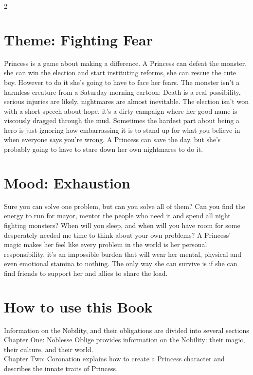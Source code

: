 \begin{multicols}{2}
\section*{Theme: Fighting Fear}

Princess is a game about making a difference. A Princess can defeat the monster, she can win the election and start instituting reforms, she can rescue the cute boy. However to do it she’s going to have to face her fears. The monster isn’t a harmless creature from a Saturday morning cartoon: Death is a real possibility, serious injuries are likely, nightmares are almost inevitable. The election isn’t won with a short speech about hope, it’s a dirty campaign where her good name is viscously dragged through the mud. Sometimes the hardest part about being a hero is just ignoring how embarrassing it is to stand up for what you believe in when everyone says you're wrong. A Princess can save the day, but she’s probably going to have to stare down her own nightmares to do it. 

\section*{Mood: Exhaustion}

Sure you can solve one problem, but can you solve all of them? Can you find the energy to run for mayor, mentor the people who need it and spend all night fighting monsters? When will you sleep, and when will you have room for some desperately needed me time to think about your own problems? A Princess’ magic makes her feel like every problem in the world is her personal responsibility, it’s an impossible burden that will wear her mental, physical and even emotional stamina to nothing. The only way she can survive is if she can find friends to support her and allies to share the load. 

\section*{How to use this Book}

Information on the Nobility, and their obligations are divided into several sections\\

\noindent Chapter One: Noblesse Oblige provides information on the Nobility: their magic, their culture, and their world. \\

\noindent Chapter Two: Coronation explains how to create a Princess character and describes the innate traits of  Princess.\\


\end{multicols}
